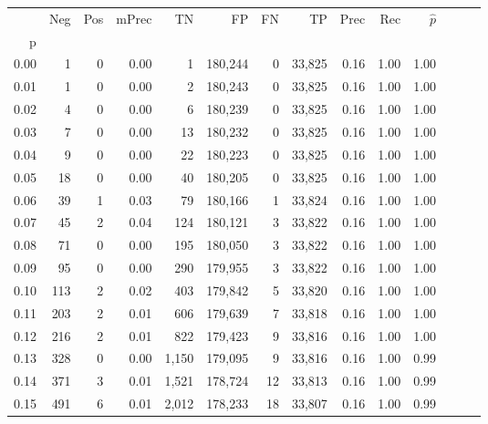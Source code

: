 \begin{tabular}{rrrrrrrrrrrrrr}
\toprule
{} &    Neg &    Pos & mPrec &       TN &       FP &      FN &      TP &  Prec &   Rec & $\hat{p}$ \\
p    &        &        &       &          &          &         &         &       &       &           \\
\midrule
0.00 &      1 &      0 &  0.00 &        1 &  180,244 &       0 &  33,825 &  0.16 &  1.00 &      1.00 \\
0.01 &      1 &      0 &  0.00 &        2 &  180,243 &       0 &  33,825 &  0.16 &  1.00 &      1.00 \\
0.02 &      4 &      0 &  0.00 &        6 &  180,239 &       0 &  33,825 &  0.16 &  1.00 &      1.00 \\
0.03 &      7 &      0 &  0.00 &       13 &  180,232 &       0 &  33,825 &  0.16 &  1.00 &      1.00 \\
0.04 &      9 &      0 &  0.00 &       22 &  180,223 &       0 &  33,825 &  0.16 &  1.00 &      1.00 \\
0.05 &     18 &      0 &  0.00 &       40 &  180,205 &       0 &  33,825 &  0.16 &  1.00 &      1.00 \\
0.06 &     39 &      1 &  0.03 &       79 &  180,166 &       1 &  33,824 &  0.16 &  1.00 &      1.00 \\
0.07 &     45 &      2 &  0.04 &      124 &  180,121 &       3 &  33,822 &  0.16 &  1.00 &      1.00 \\
0.08 &     71 &      0 &  0.00 &      195 &  180,050 &       3 &  33,822 &  0.16 &  1.00 &      1.00 \\
0.09 &     95 &      0 &  0.00 &      290 &  179,955 &       3 &  33,822 &  0.16 &  1.00 &      1.00 \\
0.10 &    113 &      2 &  0.02 &      403 &  179,842 &       5 &  33,820 &  0.16 &  1.00 &      1.00 \\
0.11 &    203 &      2 &  0.01 &      606 &  179,639 &       7 &  33,818 &  0.16 &  1.00 &      1.00 \\
0.12 &    216 &      2 &  0.01 &      822 &  179,423 &       9 &  33,816 &  0.16 &  1.00 &      1.00 \\
0.13 &    328 &      0 &  0.00 &    1,150 &  179,095 &       9 &  33,816 &  0.16 &  1.00 &      0.99 \\
0.14 &    371 &      3 &  0.01 &    1,521 &  178,724 &      12 &  33,813 &  0.16 &  1.00 &      0.99 \\
0.15 &    491 &      6 &  0.01 &    2,012 &  178,233 &      18 &  33,807 &  0.16 &  1.00 &      0.99 \\

\end{tabular}
